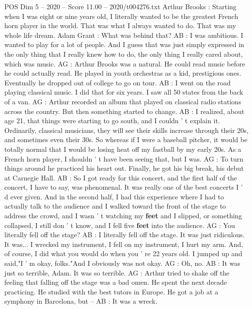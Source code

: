 \begin{textsample}{POS Dim 5 – 2020 – Score 11.00 – 2020/t004276.txt}  \label{ex:f5_pos_061}
Arthur Brooks : Starting when I was eight or nine years old, I literally wanted to be the greatest French horn player in the world.
That was what I always wanted to do.
That was my whole life dream.
Adam Grant : What was behind that?
AB : I was ambitious.
I wanted to play for a lot of people.
And I guess that was just simply expressed in the only thing that I really knew how to do, the only thing I really cared about, which was music.
AG : Arthur Brooks was a natural.
He could read music before he could actually read.
He played in youth orchestras as a kid, prestigious ones.
Eventually he dropped out of college to go on tour.
AB : I went on the road playing classical music.
I did that for six years.
I saw all 50 states from the back of a van.
AG : Arthur recorded an album that played on classical radio stations across the country.
But then something started to change.
AB : I realized, about age 21, that things were starting to go south, and I couldn ' t explain it.
Ordinarily, classical musicians, they will see their skills increase through their 20s, and sometimes even their 30s.
So whereas if I were a baseball pitcher, it would be totally normal that I would be losing heat off my fastball by my early 20s.
As a French horn player, I shouldn ' t have been seeing that, but I was.
AG : To turn things around he practiced his heart out.
Finally, he got his big break, his debut at Carnegie Hall.
AB : So I got ready for this concert, and the first half of the concert, I have to say, was phenomenal.
It was really one of the best concerts I ' d ever given.
And in the second half, I had this experience where I had to actually talk to the audience and I walked toward the front of the stage to address the crowd, and I wasn ' t watching my \textbf{feet} and I slipped, or something collapsed, I still don ' t know, and I fell five \textbf{feet} into the audience.
AG : You literally fell off the stage?
AB : I literally fell off the stage.
It was just ridiculous.
It was...
I wrecked my instrument, I fell on my instrument, I hurt my arm.
And, of course, I did what you would do when you ' re 22 years old.
I jumped up and said,"I ' m okay, folks."And I obviously was not okay.
AG : Oh, no.
AB : It was just so terrible, Adam.
It was so terrible.
AG : Arthur tried to shake off the feeling that falling off the stage was a bad omen.
He spent the next decade practicing.
He studied with the best tutors in Europe.
He got a job at a symphony in Barcelona, but -- AB : It was a wreck.

\end{textsample}
